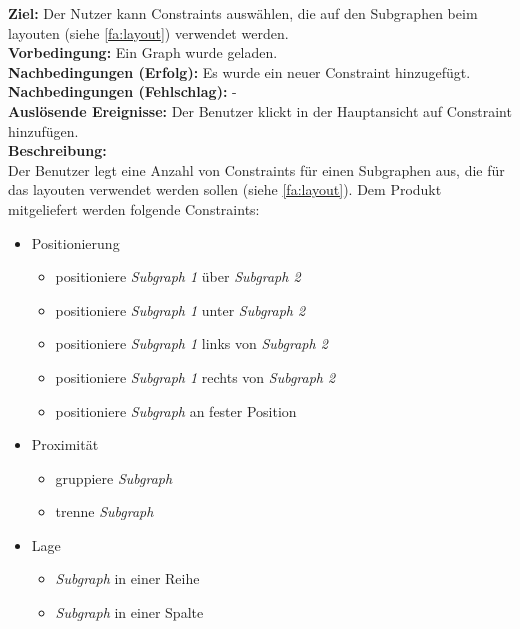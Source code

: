 \label{fa:constraints}
\textbf{Ziel:} Der Nutzer kann Constraints auswählen, die auf den \gls{Subgraph}en beim layouten (siehe \ref{fa:layout}) verwendet werden.\\
\textbf{Vorbedingung:} Ein Graph wurde geladen.\\
\textbf{Nachbedingungen (Erfolg):} Es wurde ein neuer Constraint hinzugefügt.\\
\textbf{Nachbedingungen (Fehlschlag):} -\\
\textbf{Auslösende Ereignisse:} Der Benutzer klickt in der Hauptansicht auf Constraint hinzufügen.\\
\textbf{Beschreibung: } \\
Der Benutzer legt eine Anzahl von Constraints für einen \gls{Subgraph}en aus, die für das layouten verwendet werden sollen (siehe \ref{fa:layout}).
Dem Produkt mitgeliefert werden folgende Constraints: %
\begin{itemize}[nolistsep]
  \item Positionierung
  \begin{itemize}[nolistsep]
    \item positioniere \textit{Subgraph 1} über \textit{Subgraph 2}
    \item positioniere \textit{Subgraph 1} unter \textit{Subgraph 2}
    \item positioniere \textit{Subgraph 1} links von \textit{Subgraph 2}
    \item positioniere \textit{Subgraph 1} rechts von \textit{Subgraph 2}
    \item positioniere \textit{Subgraph} an fester Position
  \end{itemize}
  \item Proximität
  \begin{itemize}[nolistsep]
    \item gruppiere \textit{Subgraph}
    \item trenne \textit{Subgraph}
  \end{itemize}
  \item Lage
  \begin{itemize}[nolistsep]
    \item \textit{Subgraph} in einer Reihe
    \item \textit{Subgraph} in einer Spalte
  \end{itemize}
\end{itemize}

